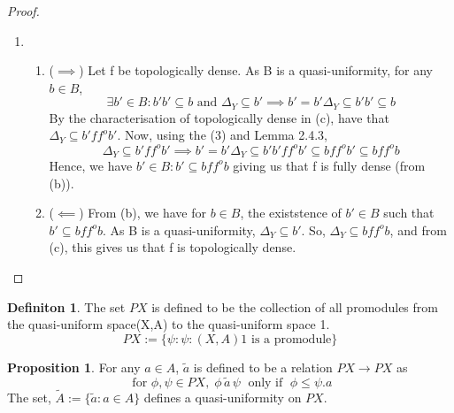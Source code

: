 \documentclass[18pt,a4paper]{article}
\makeatletter
\theoremstyle{definition}
\newtheorem{definition}{Definiton}[section]
\newtheorem{proop}{Proposition}[section]
\newcommand{\carrow}{}%
\DeclareRobustCommand{\carrow}{%
	\mathrel{\vphantom{\rightarrow}\mathpalette\circle@arrow\relax}%
}
\newcommand{\circle@arrow}[2]{%
	\m@th
	\ooalign{%
		\hidewidth$#1\circ\mkern1mu$\hidewidth\cr
	$#1\longrightarrow$\cr}%
}
\makeatother
\begin{document}
\begin{proof}
\begin{enumerate}[label=(\alph*)]
\item \begin{enumerate}[label=(\roman*)]
	\item
			($\implies $) Let f be topologically dense. As B is a quasi-uniformity, for any $b \in B$,
			\begin{equation}\exists b' \in B : b'b' \subseteq b \text{ and } \Delta_Y \subseteq b'
				\implies b'=b'\Delta_Y \subseteq b'b' \subseteq b
			\end{equation}
			By the characterisation of topologically dense in (c), have that $\Delta_Y \subseteq b'f f^o b'$.
			Now, using the (3) and Lemma 2.4.3,
			\[ \Delta_Y \subseteq b'f f^o b' \implies b'=b'\Delta_Y \subseteq b'b'f f^o b' \subseteq bf f^o b'
			\subseteq bf f^o b\]
			Hence, we have $b'\in B : b' \subseteq bf f^o b$ giving us that f is fully dense (from (b)).
		\item ($\impliedby$) From (b), we have for $b \in B$, the existstence of $b' \in B$ such that $
			b' \subseteq bf f^o b$. As B is a quasi-uniformity, $\Delta_Y \subseteq b'$. So,
			$\Delta_Y \subseteq bf f^o b$, and from (c), this gives us that f is topologically dense.
	\end{enumerate}
\end{enumerate}
\end{proof}
\begin{definition}%
	The set $PX$ is defined to be the collection of all promodules from the quasi-uniform space(X,A)
	to the quasi-uniform space 1.
	\[PX:=\{\psi : \psi:(X,A) \carrow 1 \text{ is a promodule} \}\]
\end{definition}
\begin{proop}%
	For any $a\in A$, $$ is defined to be a relation $PX \to PX$ as
	\[ \text{ for } \phi,\psi \in PX, \; \phi \, \tilde{a} \, \psi \; \text{ only if } \;
	\phi \leq \psi.a \]
	The set, $:=\{:a \in A\}$ defines a quasi-uniformity on $PX$.
\end{proop}
\end{document}
